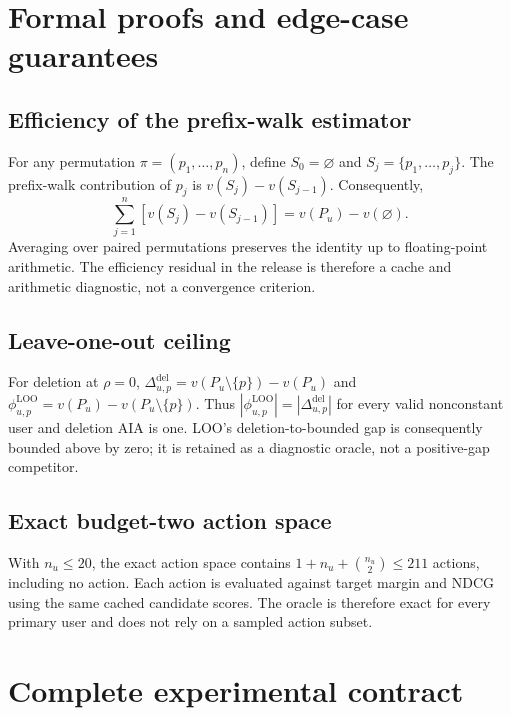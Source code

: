 \documentclass[pdflatex,sn-basic,Numbered]{sn-jnl}
\begin{document}
\begin{appendices}
\section{Formal proofs and edge-case guarantees}\label{app:proofs}

\subsection{Efficiency of the prefix-walk estimator}
For any permutation $\pi=(p_1,\ldots,p_n)$, define $S_0=\varnothing$ and $S_j=\{p_1,\ldots,p_j\}$. The prefix-walk contribution of $p_j$ is $v(S_j)-v(S_{j-1})$. Consequently,
\begin{equation}
\sum_{j=1}^{n}\left[v(S_j)-v(S_{j-1})\right]=v(P_u)-v(\varnothing).
\end{equation}
Averaging over paired permutations preserves the identity up to floating-point arithmetic. The efficiency residual in the release is therefore a cache and arithmetic diagnostic, not a convergence criterion.

\subsection{Leave-one-out ceiling}
For deletion at $\rho=0$, $\Delta^{\mathrm{del}}_{u,p}=v(P_u\setminus\{p\})-v(P_u)$ and $\phi^{\mathrm{LOO}}_{u,p}=v(P_u)-v(P_u\setminus\{p\})$. Thus $|\phi^{\mathrm{LOO}}_{u,p}|=|\Delta^{\mathrm{del}}_{u,p}|$ for every valid nonconstant user and deletion AIA is one. LOO's deletion-to-bounded gap is consequently bounded above by zero; it is retained as a diagnostic oracle, not a positive-gap competitor.

\subsection{Exact budget-two action space}
With $n_u\le20$, the exact action space contains $1+n_u+\binom{n_u}{2}\le211$ actions, including no action. Each action is evaluated against target margin and NDCG using the same cached candidate scores. The oracle is therefore exact for every primary user and does not rely on a sampled action subset.

\section{Complete experimental contract}\label{app:contract}


\end{appendices}
\end{document}

